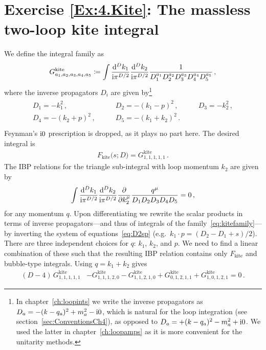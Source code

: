\section*{Exercise \ref{Ex:4.Kite}: The massless two-loop kite integral}
\label{Sol:4.Kite}
We define the integral family as
\begin{align} \label{eq:kitefamily}
G^{\text{kite}}_{a_1,a_2,a_3,a_4,a_5} \coloneqq \int \frac{\mathrm{d}^D k_1}{\mathrm{i} \pi^{D/2}} \frac{\mathrm{d}^D k_2}{\mathrm{i} \pi^{D/2}}
   \frac{1}{D_1^{a_1} D_2^{a_2} D_3^{a_3} D_4^{a_4} D_5^{a_5}} \,,
\end{align}
where the inverse propagators $D_i$ are given by\footnote{In chapter~\ref{ch:loopints} we write the inverse propagators as $D_a = -(k-q_a)^2 + m_a^2 - \mathrm{i} 0 $, which is natural for the loop integration (see section~\ref{sec:ConventionsCh4}), as opposed to $D_a = +(k-q_a)^2 - m_a^2 + \mathrm{i} 0$. We used the latter in chapter~\ref{ch:loopamps} as it is more convenient for the unitarity methods.}
\begin{align} \label{eq:D2sp}
\begin{array}{lll}
D_1 = - k_1^2 \,,  & D_2 = -(k_1-p)^2 \,, \quad \quad & D_3 = -k_2^2 \,, \\
D_4 = -(k_2+p)^2\,, \quad \quad & D_5 = -(k_1+k_2)^2\,. & \\
\end{array}
\end{align}
Feynman's $\mathrm{i} 0$ prescription is dropped, as it plays no part here. The desired integral is
\begin{align}
F_{\text{kite}}\bigl(s; D\bigr) = G^{\text{kite}}_{1,1,1,1,1} \,.
\end{align}
The IBP relations for the triangle sub-integral with loop momentum $k_2$ are given by
\begin{align}
\int \frac{\mathrm{d}^D k_1}{\mathrm{i} \pi^{D/2}} \frac{\mathrm{d}^D k_2}{\mathrm{i} \pi^{D/2}} \frac{\partial}{\partial k_2^{\mu}}  
   \frac{ q^{\mu} }{D_1 D_2 D_3 D_4 D_5}  = 0 \,,
\end{align}
for any momentum $q$. Upon differentiating we rewrite the scalar products in terms of inverse propagators---and thus of integrals of the family~\eqref{eq:kitefamily}---by inverting the system of equations~\eqref{eq:D2sp} (e.g.\ $k_1 \cdot p =( D_2 - D_1 + s)/2$). 
There are three independent choices for $q$: $k_1$, $k_2$, and $p$. We need to find a linear combination of these such that the resulting IBP relation contains only $F_{\text{kite}}$ and bubble-type integrals. Using $q=k_1+k_2$ gives
\begin{align}
(D-4) \, G^{\text{kite}}_{1, 1, 1, 1, 1} & - G^{\text{kite}}_{1, 1, 1, 2, 0} - 
 G^{\text{kite}}_{1, 1, 2, 1, 0} + G^{\text{kite}}_{0, 1, 2, 1, 1} + G^{\text{kite}}_{1, 0, 1, 2, 1}  = 0 \,.
 \end{align}
